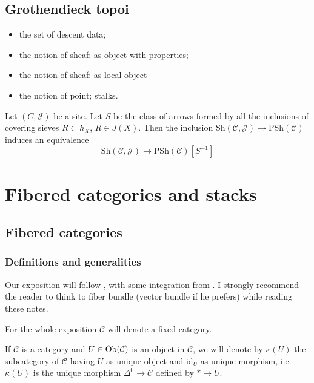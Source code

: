 \begin{refsection}
\subsection{Grothendieck topoi}

\begin{itemize}
\item the set of descent data;
\item the notion of sheaf: as object with properties;
\item the notion of sheaf: as local object
\item the notion of point; stalks.
\end{itemize}

\begin{thm}
Let $(C,\mathcal J)$ be a site. Let $S$ be the class of arrows formed by all the inclusions of covering sieves $R \subset h_X$, $R \in J(X)$. Then the inclusion $\mathrm{Sh}(\mathcal C, \mathcal J) \to \mathrm{PSh}(\mathcal C)$ induces an equivalence
\[
\mathrm{Sh}(\mathcal C, \mathcal J) \to \mathrm{PSh}(\mathcal C)[S^{-1}]
\]
\end{thm}

\section{Fibered categories and stacks} \label{fibered categories}

\subsection{Fibered categories}

\subsubsection*{Definitions and generalities}

Our exposition will follow \cite[Ch. III]{vistoli}, with some integration from \cite[Exposé VI]{sga1}. I strongly recommend the reader to think to fiber bundle (vector bundle if he prefers) while reading these notes.

For the whole exposition $\mathcal C$ will denote a fixed category.

\begin{notation}
If $\mathcal C$ is a category and $U \in \mathrm{Ob}(\mathcal C)$ is an object in $\mathcal C$, we will denote by $\kappa(U)$ the subcategory of $\mathcal C$ having $U$ as unique object and $\mathrm{id}_U$ as unique morphism, i.e. $\kappa(U)$ is the unique morphism $\Delta^0 \to \mathcal C$ defined by $* \mapsto U$.
\end{notation}


\end{refsection}

